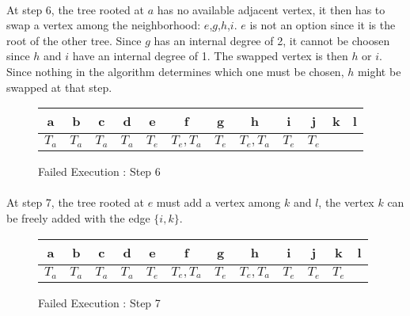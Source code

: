 \paragraph{}
At step 6, the tree rooted at $a$ has no available adjacent vertex, it then
has to swap a vertex among the neighborhood: $e$,$g$,$h$,$i$. $e$ is not an
option since it is the root of the other tree. Since $g$ has an internal degree
of 2, it cannot be choosen since $h$ and $i$ have an internal degree of 1.
The swapped vertex is then $h$ or $i$. Since nothing in the algorithm
determines which one must be chosen, $h$ might be swapped at that step.

\begin{figure}[H]
  \caption{Failed Execution : Step 6}
  \begin{center}
    \begin{tikzpicture}[scale=0.9,transform shape]
      
    \end{tikzpicture}
    \begin{tabular}{|c|c|c|c|c|c|c|c|c|c|c|c|}
\hline
a & b & c & d & e & f & g & h & i & j & k & l\\
\hline
$T_a$ & $T_a$ & $T_a$ & $T_a$ & $T_e$ & $T_e, T_a$ & $T_e$ & $T_e, T_a$ & $T_e$ & $T_e$ & &\\
\hline
    \end{tabular}
  \end{center}
\end{figure}

\paragraph{}
At step 7, the tree rooted at $e$ must add a vertex among $k$ and $l$, the
vertex $k$ can be freely added with the edge $\{i,k\}$.

\begin{figure}[H]
  \caption{Failed Execution : Step 7}
  \begin{center}
    \begin{tikzpicture}[scale=0.9,transform shape]
      
    \end{tikzpicture}
    \begin{tabular}{|c|c|c|c|c|c|c|c|c|c|c|c|}
\hline
a & b & c & d & e & f & g & h & i & j & k & l\\
\hline
$T_a$ & $T_a$ & $T_a$ & $T_a$ & $T_e$ & $T_e, T_a$ & $T_e$ & $T_e, T_a$ & $T_e$ & $T_e$ & $T_e$ &\\
\hline
    \end{tabular}
  \end{center}
\end{figure}


